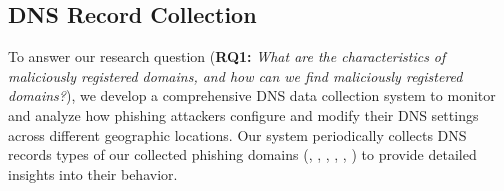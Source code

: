 





\subsection{DNS Record Collection}
\label{sec:dns_record_collection}
To answer our research question 
(\textbf{RQ1:} \textit{What are the characteristics of maliciously registered domains, and how can we find maliciously registered domains?}),
we develop a comprehensive DNS data collection system to monitor and analyze how phishing attackers configure and modify their DNS settings across different geographic locations. 
Our system periodically collects DNS records types of our collected phishing domains 
(\ie, , , , , )
to provide detailed insights into their behavior.


